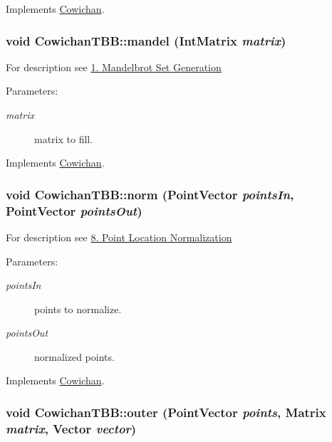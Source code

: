 Implements \hyperlink{class_cowichan_d449595ef2fe934bdd128ac8b1f51d07}{Cowichan}.\hypertarget{class_cowichan_t_b_b_1e58b60ff22a58aba69567ecc6740878}{
\subsubsection[{mandel}]{\setlength{\rightskip}{0pt plus 5cm}void CowichanTBB::mandel ({\bf IntMatrix} {\em matrix})}}
\label{class_cowichan_t_b_b_1e58b60ff22a58aba69567ecc6740878}


For description see \hyperlink{index_mandel_sec}{1. Mandelbrot Set Generation} \begin{Desc}
\item[Parameters:]
\begin{description}
\item[{\em matrix}]matrix to fill. \end{description}
\end{Desc}


Implements \hyperlink{class_cowichan_ec6cc4eb2ad444474b923532167e98a2}{Cowichan}.\hypertarget{class_cowichan_t_b_b_ca08645b51a242317a115cd7ce7d81fe}{
\subsubsection[{norm}]{\setlength{\rightskip}{0pt plus 5cm}void CowichanTBB::norm ({\bf PointVector} {\em pointsIn}, \/  {\bf PointVector} {\em pointsOut})}}
\label{class_cowichan_t_b_b_ca08645b51a242317a115cd7ce7d81fe}


For description see \hyperlink{index_norm_sec}{8. Point Location Normalization} \begin{Desc}
\item[Parameters:]
\begin{description}
\item[{\em pointsIn}]points to normalize. \item[{\em pointsOut}]normalized points. \end{description}
\end{Desc}


Implements \hyperlink{class_cowichan_3df21e3c627958114e045c3559a29f30}{Cowichan}.\hypertarget{class_cowichan_t_b_b_92a763b9733cdcceda13b7b7ea0bc229}{
\subsubsection[{outer}]{\setlength{\rightskip}{0pt plus 5cm}void CowichanTBB::outer ({\bf PointVector} {\em points}, \/  {\bf Matrix} {\em matrix}, \/  {\bf Vector} {\em vector})}}
\label{class_cowichan_t_b_b_92a763b9733cdcceda13b7b7ea0bc229}


